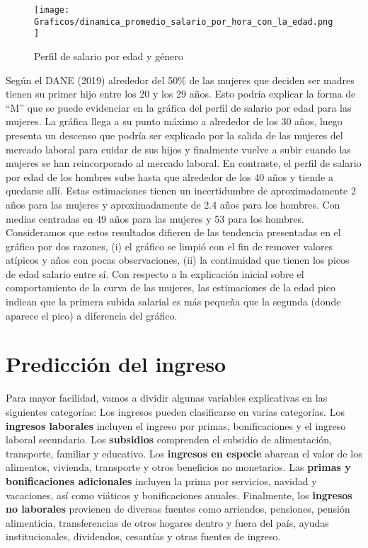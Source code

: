 \documentclass[article,11 pt]{article}
\begin{document}
\begin{figure}[H]
    \centering
    \caption{Perfil de salario por edad y género}
    \texttt{[image: Graficos/dinamica\_promedio\_salario\_por\_hora\_con\_la\_edad.png]}
    \label{fig:enter-label}
\end{figure}

Según el DANE (2019) alrededor del 50\% de las mujeres que deciden ser madres tienen su primer hijo entre los 20 y los 29 años. Esto podría explicar la forma de “M” que se puede evidenciar en la gráfica del perfil de salario por edad para las mujeres. La gráfica llega a su punto máximo a alrededor de los 30 años, luego presenta un descenso que podría ser explicado por la salida de las mujeres del mercado laboral para cuidar de sus hijos y finalmente vuelve a subir cuando las mujeres se han reincorporado al mercado laboral. En contraste, el perfil de salario por edad de los hombres sube hasta que alrededor de los 40 años y tiende a quedarse allí.  Estas estimaciones tienen un incertidumbre de aproximadamente 2 años para las mujeres y aproximadamente de 2.4 años para los hombres. Con medias centradas en 49 años para las mujeres y 53 para los hombres. 
Consideramos que estos resultados difieren de las tendencia presentadas en el gráfico por dos razones, (i) el gráfico se limpió con el fin de remover valores atípicos y años con pocas observaciones, (ii) la continuidad que tienen los picos de edad salario entre sí. Con respecto a la explicación inicial sobre el comportamiento de la curva de las mujeres, las estimaciones de la edad pico indican que la primera subida salarial es más pequeña que la segunda (donde aparece el pico) a diferencia del gráfico.

\section{Predicción del ingreso}

Para mayor facilidad, vamos a dividir algunas variables explicativas en las siguientes categorías:
Los ingresos pueden clasificarse en varias categorías. Los \textbf{ingresos laborales} incluyen el ingreso por primas, bonificaciones y el ingreso laboral secundario. Los \textbf{subsidios} comprenden el subsidio de alimentación, transporte, familiar y educativo. Los \textbf{ingresos en especie} abarcan el valor de los alimentos, vivienda, transporte y otros beneficios no monetarios. Las \textbf{primas y bonificaciones adicionales} incluyen la prima por servicios, navidad y vacaciones, así como viáticos y bonificaciones anuales. Finalmente, los \textbf{ingresos no laborales} provienen de diversas fuentes como arriendos, pensiones, pensión alimenticia, transferencias de otros hogares dentro y fuera del país, ayudas institucionales, dividendos, cesantías y otras fuentes de ingreso.
\end{document}
